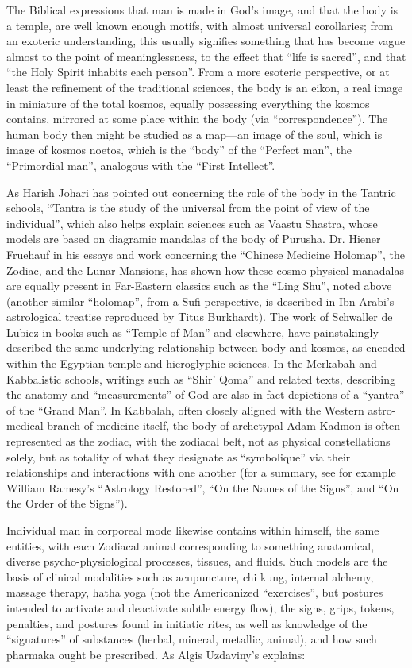 The Biblical expressions that man is made in God's image, and that the body is a temple, are well known enough motifs, with almost universal corollaries; from an exoteric understanding, this usually signifies something that has become vague almost to the point of meaninglessness, to the effect that ``life is sacred'', and that ``the Holy Spirit inhabits each person''. From a more esoteric perspective, or at least the refinement of the traditional sciences, the body is an eikon, a real image in miniature of the total kosmos, equally possessing everything the kosmos contains, mirrored at some place within the body (via ``correspondence''). The human body then might be studied as a map---an image of the soul, which is image of kosmos noetos, which is the ``body'' of the ``Perfect man'', the ``Primordial man'', analogous with the ``First Intellect''.

As Harish Johari has pointed out concerning the role of the body in the Tantric schools, ``Tantra is the study of the universal from the point of view of the individual'', which also helps explain sciences such as Vaastu Shastra, whose models are based on diagramic mandalas of the body of Purusha. Dr. Hiener Fruehauf in his essays and work concerning the ``Chinese Medicine Holomap'', the Zodiac, and the Lunar Mansions, has shown how these cosmo-physical manadalas are equally present in Far-Eastern classics such as the ``Ling Shu'', noted above (another similar ``holomap'', from a Sufi perspective, is described in Ibn Arabi's astrological treatise reproduced by Titus Burkhardt). The work of Schwaller de Lubicz in books such as ``Temple of Man'' and elsewhere, have painstakingly described the same underlying relationship between body and kosmos, as encoded within the Egyptian temple and hieroglyphic sciences. In the Merkabah and Kabbalistic schools, writings such as ``Shir' Qoma'' and related texts, describing the anatomy and ``measurements'' of God are also in fact depictions of a ``yantra'' of the ``Grand Man''. In Kabbalah, often closely aligned with the Western astro-medical branch of medicine itself, the body of archetypal Adam Kadmon is often represented as the zodiac, with the zodiacal belt, not as physical constellations solely, but as totality of what they designate as ``symbolique'' via their relationships and interactions with one another (for a summary, see for example William Ramesy's ``Astrology Restored'', ``On the Names of the Signs'', and ``On the Order of the Signs'').

Individual man in corporeal mode likewise contains within himself, the same entities, with each Zodiacal animal corresponding to something anatomical, diverse psycho-physiological processes, tissues, and fluids. Such models are the basis of clinical modalities such as acupuncture, chi kung, internal alchemy, massage therapy, hatha yoga (not the Americanized ``exercises'', but postures intended to activate and deactivate subtle energy flow), the signs, grips, tokens, penalties, and postures found in initiatic rites, as well as knowledge of the ``signatures'' of substances (herbal, mineral, metallic, animal), and how such pharmaka ought be prescribed. As Algis Uzdaviny's explains:

